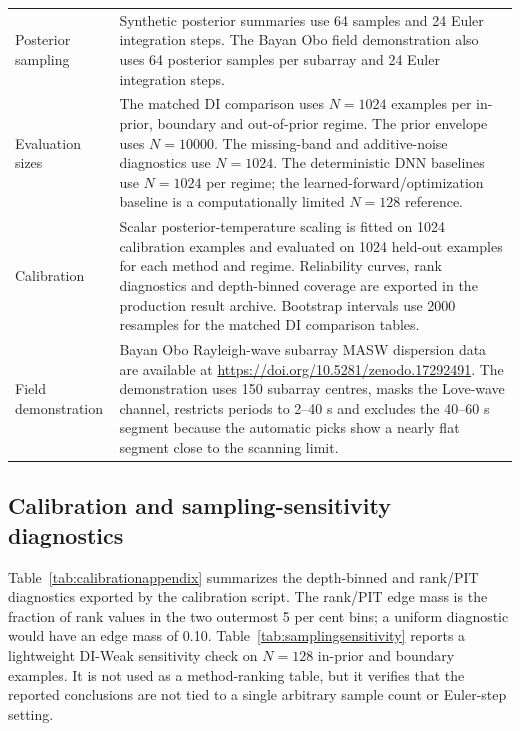 \documentclass[referee]{gji}
\begin{document}
\begin{longtable}{@{}p{}p{}@{}}
Posterior sampling & Synthetic posterior summaries use 64 samples and 24 Euler integration steps. The Bayan Obo field demonstration also uses 64 posterior samples per subarray and 24 Euler integration steps. \\
Evaluation sizes & The matched DI comparison uses $N=1024$ examples per in-prior, boundary and out-of-prior regime. The prior envelope uses $N=10000$. The missing-band and additive-noise diagnostics use $N=1024$. The deterministic DNN baselines use $N=1024$ per regime; the learned-forward/optimization baseline is a computationally limited $N=128$ reference. \\
Calibration & Scalar posterior-temperature scaling is fitted on 1024 calibration examples and evaluated on 1024 held-out examples for each method and regime. Reliability curves, rank diagnostics and depth-binned coverage are exported in the production result archive. Bootstrap intervals use 2000 resamples for the matched DI comparison tables. \\
Field demonstration & Bayan Obo Rayleigh-wave subarray MASW dispersion data are available at \url{https://doi.org/10.5281/zenodo.17292491}. The demonstration uses 150 subarray centres, masks the Love-wave channel, restricts periods to 2--40 s and excludes the 40--60 s segment because the automatic picks show a nearly flat segment close to the scanning limit. \\
\end{longtable}
\normalsize

\subsection{Calibration and sampling-sensitivity diagnostics}

Table~\ref{tab:calibrationappendix} summarizes the depth-binned and rank/PIT diagnostics exported by the calibration script. The rank/PIT edge mass is the fraction of rank values in the two outermost 5 per cent bins; a uniform diagnostic would have an edge mass of 0.10. Table~\ref{tab:samplingsensitivity} reports a lightweight DI-Weak sensitivity check on $N=128$ in-prior and boundary examples. It is not used as a method-ranking table, but it verifies that the reported conclusions are not tied to a single arbitrary sample count or Euler-step setting.
\end{document}
